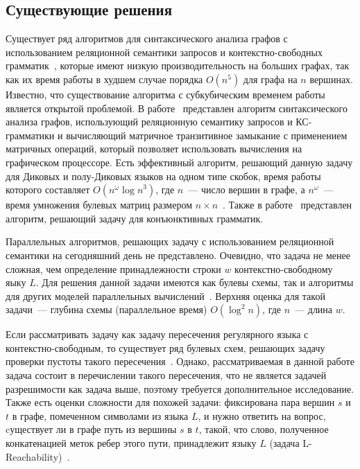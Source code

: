 \subsection{Существующие решения}
Существует ряд алгоритмов для синтаксического анализа графов с использованием реляционной семантики запросов и контекстно-свободных грамматик~\cite{MatrixMult, HellingsCFPQ}, которые имеют низкую производительность на больших графах, так как их время работы в худшем случае порядка $O(n^5)$ для графа на $n$ вершинах. Известно, что существование алгоритма с субкубическим временем работы является открытой проблемой. В работе~\cite{MatrixMult} представлен алгоритм синтаксического анализа графов, использующий реляционную семантику запросов и КС-грамматики и вычисляющий матричное транзитивное замыкание с применением матричных операций, который позволяет использовать вычисления на графическом процессоре. Есть эффективный алгоритм, решающий данную задачу для Диковых и полу-Диковых языков на одном типе скобок, время работы которого составляет $O(n^{\omega}{\log{n}}^3)$, где $n$~--- число вершин в графе, а $n^{\omega}$~--- время умножения булевых матриц размером $n \times n$~\cite{Bradford}. Также в работе~\cite{ConjPath} представлен алгоритм, решающий задачу для конъюнктивных грамматик.

Параллельных алгоритмов, решающих задачу с использованием реляционной семантики на сегодняшний день не представлено. Очевидно, что задача не менее сложная, чем определение принадлежности строки $w$ контекстно-свободному яыку $L$. Для решения данной задачи имеются как булевы схемы, так и алгоритмы для других моделей параллельных вычислений~\cite{Brent, Ruzzo, Rytter}. Верхняя оценка для такой задачи~--- глубина схемы (параллельное время) $O(\log^2 n)$, где $n$~--- длина $w$.

Если рассматривать задачу как задачу пересечения регулярного языка с контекстно-свободным, то существует ряд булевых схем, решающих задачу проверки пустоты такого пересечения~\cite{Lohrey, Regularrealizability, Swernofsky2015OnTC}. Однако, рассматриваемая в данной работе задача состоит в перечислении такого пересечения, что не является задачей разрешимости как задача выше, поэтому требуется дополнительное исследование. Также есть оценки сложности для похожей задачи: фиксирована пара вершин $s$ и $t$ в графе, помеченном символами из языка $L$, и нужно ответить на вопрос, cуществует ли в графе путь из вершины $s$ в $t$, такой, что слово, полученное конкатенацией меток ребер этого пути, принадлежит языку $L$ (задача L-Reachability)~\cite{LReach}.
